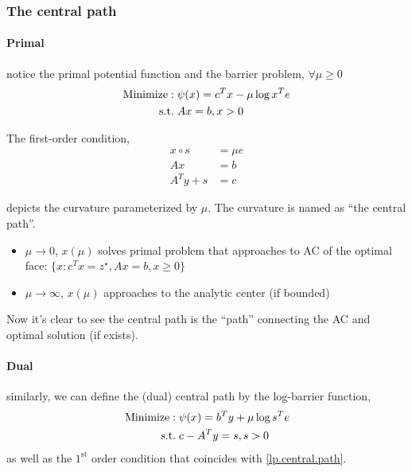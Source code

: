 \documentclass[main]{subfiles}
\begin{document}
\subsubsection{The central path}

\paragraph{Primal} notice the primal potential function and the barrier problem, \(\forall \mu \ge 0\)
\begin{equation}
    \begin{aligned}
        \mathrm{Minimize:\;} & \psi(x) = c^Tx - \mu\log x^Te \\
        \mathrm{s.t.\;} & Ax = b, x > 0
    \end{aligned}
\end{equation}

The first-order condition,
\begin{equation} \label{lp.central.path}
    \begin{aligned}
        x \circ s & =\mu e \\
        A x       & =b     \\
        A^T y+s   & =c
    \end{aligned}
\end{equation}

depicts the curvature parameterized by \(\mu\). The curvature is named as ``the central path''.
\begin{itemize}
    \item \(\mu \to 0\), \(x(\mu)\) solves primal problem that approaches to AC of the optimal face: \(\{x: c^Tx = z^\star, Ax=b, x\ge 0\}\)
    \item \(\mu \to \infty\), \(x(\mu)\) approaches to the analytic center (if bounded)
\end{itemize}

Now it's clear to see the central path is the ``path'' connecting the AC and optimal solution (if exists).

\paragraph{Dual} similarly, we can define the (dual) central path by the log-barrier function,
\begin{equation}
    \begin{aligned}
        \mathrm{Minimize:\;} & \psi(x)                                 = b^Ty + \mu\log s^Te \\
        \mathrm{s.t.\;} & c - A^Ty = s, s > 0
    \end{aligned}
\end{equation}
as well as the \(1^\textrm{st}\) order condition that coincides with \eqref{lp.central.path}.
\end{document}
